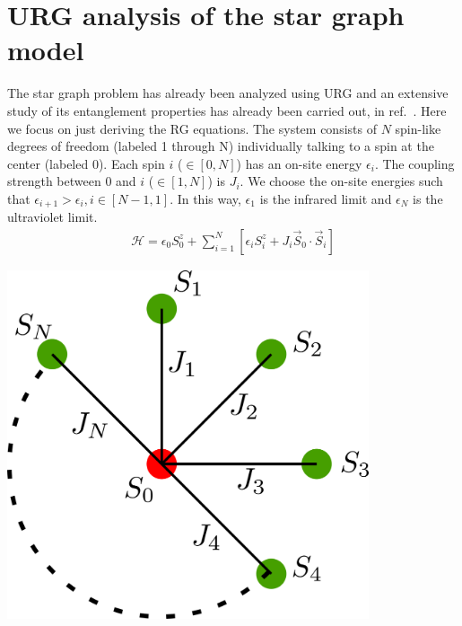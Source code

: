 \section{URG analysis of the star graph model}
\noindent
\begin{minipage}{0.5\textwidth}
	The star graph problem has already been analyzed using URG and an extensive study of its entanglement properties has already been carried out, in ref.~\cite{spa_2022}. Here we focus on just deriving the RG equations. The system consists of \(N\) spin-like degrees of freedom (labeled 1 through N) individually talking to a spin at the center (labeled 0). Each spin \(i\) (\(\in \left[0,N\right]\)) has an on-site energy \(\epsilon_i\). The coupling strength between 0 and \(i\) (\(\in \left[1,N\right]\)) is \(J_i\). We choose the on-site energies such that \(\epsilon_{i+1} > \epsilon_i, i\in\left[N-1,1\right]\). In this way, \(\epsilon_1\) is the infrared limit and \(\epsilon_N\) is the ultraviolet limit.
\begin{equation}\begin{aligned}
	\mathcal{H} = \epsilon_0 S^z_0 + \sum_{i=1}^N\left[\epsilon_i S^z_i + J_i \vec{S}_0 \cdot \vec{S}_i\right]
\end{aligned}\end{equation}
\end{minipage}
\hfill
\begin{minipage}{0.4\textwidth}
\begin{center}
\includegraphics[width=0.8\textwidth]{../figures/stargraph_.png}
\end{center}
\end{minipage}

